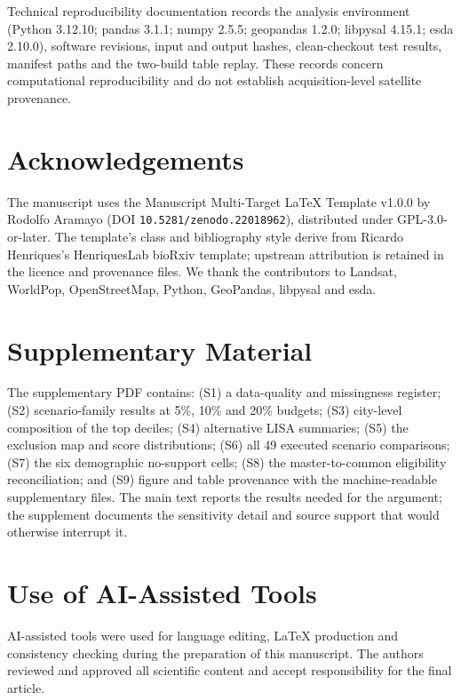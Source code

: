 \documentclass[times,twoside]{_Templates/MultiTargetManuscript}
\begin{document}
Technical reproducibility documentation records the analysis environment
(Python 3.12.10; pandas 3.1.1; numpy 2.5.5; geopandas 1.2.0; libpysal 4.15.1;
esda 2.10.0), software revisions, input and output hashes, clean-checkout test
results, manifest paths and the two-build table replay. These records concern
computational reproducibility and do not establish acquisition-level satellite
provenance.

\section*{Acknowledgements}

The manuscript uses the Manuscript Multi-Target LaTeX Template v1.0.0 by Rodolfo
Aramayo \citep{aramayo2026} (DOI \texttt{10.5281/zenodo.22018962}), distributed under
GPL-3.0-or-later. The template's class and bibliography style derive from
Ricardo Henriques's HenriquesLab bioRxiv template; upstream attribution is
retained in the licence and provenance files. We thank the contributors to
Landsat, WorldPop, OpenStreetMap, Python, GeoPandas, libpysal and esda.

\section*{Supplementary Material}

The supplementary PDF contains: (S1) a data-quality and missingness register;
(S2) scenario-family results at 5\%, 10\% and 20\% budgets; (S3) city-level
composition of the top deciles; (S4) alternative LISA summaries; (S5) the
exclusion map and score distributions; (S6) all 49 executed scenario
comparisons; (S7) the six demographic no-support cells; (S8) the
master-to-common eligibility reconciliation; and (S9) figure and table
provenance with the machine-readable supplementary files. The main text reports
the results needed for the argument; the supplement documents the sensitivity
detail and source support that would otherwise interrupt it.

\section*{Use of AI-Assisted Tools}

AI-assisted tools were used for language editing, LaTeX production and
consistency checking during the preparation of this manuscript. The authors
reviewed and approved all scientific content and accept responsibility for the
final article.
\end{document}

